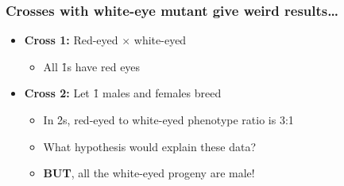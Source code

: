 \begin{frame}
    \frametitle{Crosses with white-eye mutant give weird results\ldots}
    \begin{itemize}[<+->]
        \item \textbf{Cross 1:} Red-eyed \female $\times$ white-eyed \male
            \begin{itemize}
                \item All \f{1}s have red eyes
            \end{itemize}

            \vspace{1cm}
        \item \textbf{Cross 2:} Let \f{1} males and females breed
            \begin{itemize}
                \item In \f{2}s, red-eyed to white-eyed phenotype ratio is 3:1

                \item What hypothesis would explain these data? 

                \item \textbf{BUT}, all the white-eyed progeny are male!
            \end{itemize}
    \end{itemize}
\end{frame}


